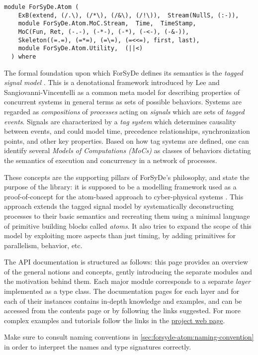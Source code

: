 \label{module:ForSyDe.Atom}
\haddockbeginheader
{\haddockverb\begin{verbatim}
module ForSyDe.Atom (
    ExB(extend, (/.\), (/*\), (/&\), (/!\)),  Stream(NullS, (:-)), 
    module ForSyDe.Atom.MoC.Stream,  Time,  TimeStamp, 
    MoC(Fun, Ret, (-.-), (-*-), (-*), (-<-), (-&-)), 
    Skeleton((=.=), (=*=), (=\=), (=<<=), first, last), 
    module ForSyDe.Atom.Utility,  (||<)
  ) where\end{verbatim}}
\haddockendheader

The formal foundation upon which ForSyDe \cite{Sander04}
 defines its semantics is the \emph{tagged signal model}
 \cite{Lee98}.  This is a denotational
 framework introduced by Lee and Sangiovanni-Vincentelli as a common
 meta model for describing properties of concurrent systems in
 general terms as sets of possible behaviors. Systems are regarded
 as \emph{compositions} of \emph{processes} acting on \emph{signals} which are sets
 of \emph{tagged events}. Signals are characterized by a \emph{tag system}
 which determines causality between events, and could model time,
 precedence relationships, synchronization points, and other key
 properties. Based on how tag systems are defined, one can identify
 several \emph{Models of Computations (MoCs)} as classes of behaviors
 dictating the semantics of execution and concurrency in a network
 of processes.\par
These concepts are the supporting pillars of ForSyDe's philosophy,
 and state the purpose of the  library: it is supposed
 to be a modelling framework used as a proof-of-concept for the
 atom-based approach to cyber-physical systems
 \cite{Ungureanu17}. This approach
 extends the tagged signal model by systematically deconstructing
 processes to their basic semantics and recreating them using a
 minimal language of primitive building blocks called \emph{atoms}. It
 also tries to expand the scope of this model by exploiting more
 aspects than just timing, by adding primitives for parallelism,
 behavior, etc.\par
The API documentation is structured as follows: this page provides
 an overview of the general notions and concepts, gently introducing
 the separate modules and the motivation behind them. Each major
 module corresponds to a separate \emph{layer}
 \cite{Ungureanu17} implemented as a type
 class. The documentation pages for each layer and for each of their
 instances contains in-depth knowledge and examples, and can be
 accessed from the contents page or by following the links
 suggested. For more complex examples and tutorials follow the links
 in the \href{https://github.com/forsyde/forsyde-atom}{project web page}.\par
 \begin{mdframed}[style=reminder,frametitle=Reminder]Make sure to consult naming conventions in  \cref{sec:forsyde-atom:naming-convention} in order to interpret the names and type signatures correctly.\end{mdframed}\par

